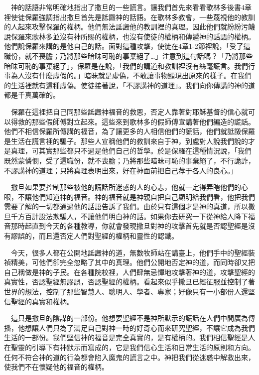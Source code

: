 \documentclass{book}
\begin{document}
　神的話語非常明確地指出了撒旦的一些謊言。讓我們首先來看看歌林多後書4章裡使徒保羅強調指出撒旦首先是詆譭神的話語。在歌林多教會，一些蔑視他的教訓的人起來攻擊保羅的權柄。他們無法詆譭他的教訓裡的真理。因此他們就紛紛污衊說保羅來歌林多並沒有神所賜的權柄，也沒有使徒的權柄和傳遞神的話語的權柄。他們說保羅來講的是他自己的話。面對這種攻擊，使徒在4章1-2節裡說，「受了這職份，就不喪膽；乃將那些暗昧可恥的事棄絕了…」注意到這句話嗎？「乃將那些暗昧可恥的事棄絕了」，保羅是在說，「我們的講道和教訓裡沒有絲毫謊言。我們行事為人沒有什麼虛假的。」暗昧就是虛偽，不敢讓事物顯現出原來的樣子。在我們的生活裡就有這種虛偽。使徒接著說，「不謬講神的道理」。我們向你傳講的神的道都是千真萬確的。

　保羅在這裡把自己同那些詆譭神福音的救恩，否定人靠著對耶穌基督的信心就可以得救的那些假師傅對立起來。這些來到歌林多的假師傅宣講著他們編造的謊話。他們不相信保羅所傳講的福音，為了讓更多的人相信他們的謊話，他們就詆譭保羅是生活在謊言裡的騙子。那些人宣稱他們的教訓來自于神，到處對人說我們說的才是真理，可其實那些都只不過是他們自己的哲學。於是保羅在這種情況說，「我們既然蒙憐憫，受了這職份，就不喪膽；乃將那些暗昧可恥的事棄絕了，不行詭詐，不謬講神的道理；只將真理表明出來，好在神面前把自己荐于各人的良心。」

　撒旦如果要控制那些被他的謊話所迷惑的人的心志，他就一定得弄瞎他們的心眼，不讓他們知道神的福音。神的福音就是神親自把自己顯明給我們看，他把我們需要了解的一切都通過他的話語告訴了我們。由於只有這個才是神的真道，所以撒旦千方百計設法欺騙人，不讓他們明白神的話。如果你去研究一下從神給人降下福音那時起直到今天的各種教導，你就會發現撒旦對神的攻擊首先就是否認聖經是沒有謬誤的，而且還否定人們對聖經的權柄和靈性的認識。

　今天，很多人都在公開地詆譭神的道，無數牧師站在講臺上，他們手中的聖經裝禎精美，可他們卻完全忽略了其中的真理。他們公開地否定神的道，而同時卻又把自己稱做是神的子民。在各種院校裡，人們肆無忌憚地攻擊著神的道，攻擊聖經的真實性，否認聖經無謬誤，否認聖經的權柄。看起來似乎撒旦已經征服並控制了著世界的想法，控制了那些智慧人、聰明人、學者、專家；好像只有一小部份人還堅信聖經的真實和權柄。

　這只是撒旦的陰謀的一部份。他想要聖經不是神所默示的謊話在人們中間廣為傳播，他想讓人們只為了滿足自己對神一時的好奇心而來研究聖經，不讓它成為我們生活的一部份。我們堅信神的福音是完全真實的，是有權柄的。我們相信聖經是人在聖靈的引導下有神默示而寫成的，它是我們信心生活和日常生活的原則和方向。任何不符合神的道的行為都會陷入魔鬼的謊言之中。神把我們從迷惑中解救出來，使我們不在懷疑他的福音的權柄。
\end{document}
